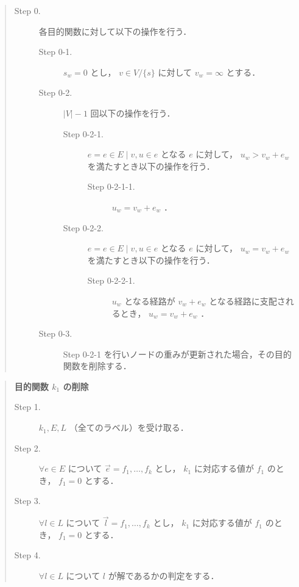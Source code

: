 \documentclass[12pt]{optlab-bachelor}
\begin{document}
\begin{quote}
  \begin{description}
    \item[Step 0.] 各目的関数に対して以下の操作を行う．
    \begin{description}
      \item[Step 0-1.] $s_w = 0$ とし， $v \in V/\{s\}$ に対して $v_w = \infty$ とする．
      \item[Step 0-2.] $|V|-1$ 回以下の操作を行う．
      \begin{description}
        \item[Step 0-2-1.] $e = {e \in E \mid v,u \in e}$ となる $e$ に対して，
        $u_w > v_w + e_w$ を満たすとき以下の操作を行う．
        \begin{description}
          \item[Step 0-2-1-1.] $u_w = v_w + e_w$ ．
        \end{description}
        \item[Step 0-2-2.] $e = {e \in E \mid v,u \in e}$ となる $e$ に対して，
        $u_w = v_w + e_w$ を満たすとき以下の操作を行う．
        \begin{description}
          \item[Step 0-2-2-1.] $u_w$ となる経路が $v_w + e_w$ となる経路に支配されるとき，
          $u_w = v_w + e_w$ ．
        \end{description}
      \end{description}
      \item[Step 0-3.] Step 0-2-1 を行いノードの重みが更新された場合，その目的関数を削除する．
    \end{description}
  \end{description}
\end{quote}

\begin{quote}
  \textbf{目的関数 $k_1$ の削除}
  \begin{description}
    \item[Step 1.] $k_1,E,L$ （全てのラベル）を受け取る．
    \item[Step 2.] $\forall e \in E$ について $\vec{e}={f_1,\ldots,f_k}$ とし， $k_1$ に対応する値が
    $f_1$ のとき， $f_1=0$ とする．
    \item[Step 3.] $\forall l \in L$ について $\vec{l}={f_1,\ldots,f_k}$ とし， $k_1$ に対応する値が
    $f_1$ のとき， $f_1=0$ とする．
    \item[Step 4.] $\forall l \in L$ について $l$ が解であるかの判定をする．
  \end{description}
\end{quote}
\end{document}

